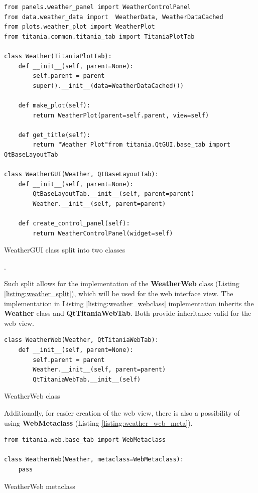 \begin{listing}[!ht]
\begin{verbatim}
from panels.weather_panel import WeatherControlPanel
from data.weather_data import  WeatherData, WeatherDataCached
from plots.weather_plot import WeatherPlot
from titania.common.titania_tab import TitaniaPlotTab

class Weather(TitaniaPlotTab):
    def __init__(self, parent=None):
        self.parent = parent
        super().__init__(data=WeatherDataCached())

    def make_plot(self):
        return WeatherPlot(parent=self.parent, view=self)

    def get_title(self):
        return "Weather Plot"from titania.QtGUI.base_tab import QtBaseLayoutTab

class WeatherGUI(Weather, QtBaseLayoutTab):
    def __init__(self, parent=None):
        QtBaseLayoutTab.__init__(self, parent=parent)
        Weather.__init__(self, parent=parent)

    def create_control_panel(self):
        return WeatherControlPanel(widget=self)
\end{verbatim}


\caption{WeatherGUI class split into two classes}.
\label{listing:weather_split}
\end{listing}


Such split allows for the implementation of the \textbf{WeatherWeb} class (Listing \ref{listing:weather_split}), which will be used for the web interface view.
The implementation in Listing \ref{listing:weather_webclass} implementation inherits the \textbf{Weather} class and \textbf{QtTitaniaWebTab}.
Both provide inheritance valid for the web view.

\begin{listing}[!ht]
\begin{verbatim}
class WeatherWeb(Weather, QtTitaniaWebTab):
    def __init__(self, parent=None):
        self.parent = parent
        Weather.__init__(self, parent=parent)
        QtTitaniaWebTab.__init__(self)
\end{verbatim}
\caption{WeatherWeb class}
\label{listing:weather_webclass}
\end{listing}
Additionally, for easier creation of the web view, there is also a possibility of using \textbf{WebMetaclass} (Listing \ref{listing:weather_web_meta}).
\begin{listing}[!ht]
\begin{verbatim}
from titania.web.base_tab import WebMetaclass

class WeatherWeb(Weather, metaclass=WebMetaclass):
    pass
\end{verbatim}
\caption{WeatherWeb metaclass}
\label{listing:weather_web_meta}
\end{listing}

